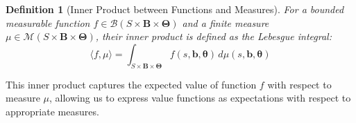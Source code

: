 \documentclass[a4paper,12pt]{report}
\newtheorem{definition}{Definition}
\begin{document}
\begin{definition}[Inner Product between Functions and Measures]
    For a bounded measurable function $f \in \mathcal{B}(S \times \boldsymbol{B}\times
        \boldsymbol{\Theta})$ and a finite measure $\mu \in \mathcal{M}(S \times \boldsymbol
        {B}\times \boldsymbol{\Theta})$, their inner product is defined as the
    Lebesgue integral:
    \begin{equation}
        \langle f, \mu \rangle = \int_{S \times \boldsymbol{B} \times \boldsymbol{\Theta}}
        f(s, \boldsymbol{b}, \boldsymbol{\theta}) \, d\mu(s, \boldsymbol{b}, \boldsymbol
        {\theta})
    \end{equation}
\end{definition}

This inner product captures the expected value of function $f$ with respect to
measure $\mu$, allowing us to express value functions as expectations with respect
to appropriate measures.
\end{document}
